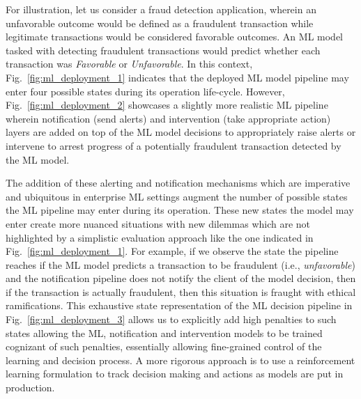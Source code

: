 For illustration, let us consider a fraud detection application, wherein an unfavorable outcome would be defined as a fraudulent transaction while legitimate transactions would be considered favorable outcomes. An ML model tasked with detecting fraudulent transactions would predict whether each transaction was \emph{Favorable} or \emph{Unfavorable}. In this context, Fig.~\ref{fig:ml_deployment_1} indicates that the deployed ML model pipeline may enter four possible states during its operation life-cycle. However, Fig.~\ref{fig:ml_deployment_2} showcases a slightly more realistic ML pipeline wherein notification (send alerts) and intervention (take appropriate action) layers are added on top of the ML model decisions to appropriately raise alerts or intervene to arrest progress of a potentially fraudulent transaction detected by the ML model.

The addition of these alerting and notification mechanisms which are imperative and ubiquitous in enterprise ML settings augment the number of possible states the ML pipeline may enter during its operation. These new states the model may enter create more nuanced situations with new dilemmas which are not highlighted by a simplistic evaluation approach like the one indicated in Fig.~\ref{fig:ml_deployment_1}. For example, if we observe the state the pipeline reaches if the ML model predicts a transaction to be fraudulent (i.e., \emph{unfavorable}) and the notification pipeline does not notify the client of the model decision, then if the transaction is actually fraudulent, then this situation is fraught with ethical ramifications. This exhaustive state representation of the ML decision pipeline in Fig.~\ref{fig:ml_deployment_3} allows us to explicitly add high penalties to such states allowing the ML, notification and intervention models to be trained cognizant of such penalties, essentially allowing fine-grained control of the learning and decision process. A more rigorous approach is to use a reinforcement learning formulation to track decision making and actions as models are put in production.